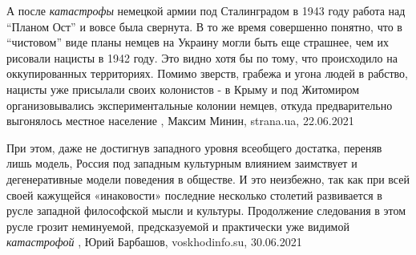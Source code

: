  
 
 
 
 

А после \emph{катастрофы} немецкой армии под Сталинградом в 1943 году работа над
\enquote{Планом Ост} и вовсе была свернута.  В то же время совершенно понятно, что в
\enquote{чистовом} виде планы немцев на Украину могли быть еще страшнее, чем их
рисовали нацисты в 1942 году. Это видно хотя бы по тому, что происходило на
оккупированных территориях.  Помимо зверств, грабежа и угона людей в рабство,
нацисты уже присылали своих колонистов - в Крыму и под Житомиром
организовывались экспериментальные колонии немцев, откуда предварительно
выгонялось местное население
  , Максим Минин, strana.ua, 22.06.2021

При этом, даже не достигнув западного уровня всеобщего достатка, переняв лишь
модель, Россия под западным культурным влиянием заимствует и дегенеративные
модели поведения в обществе. И это неизбежно, так как при всей своей кажущейся
«инаковости» последние несколько столетий развивается в русле западной
философской мысли и культуры. Продолжение следования в этом русле грозит
неминуемой, предсказуемой и практически уже видимой \emph{катастрофой}
, 
Юрий Барбашов, voskhodinfo.su, 30.06.2021

